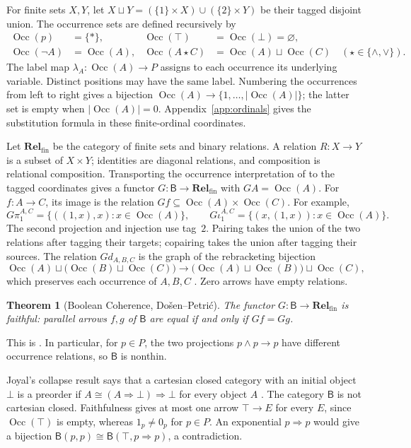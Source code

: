 \documentclass[11pt]{article}
\newtheorem{theorem}{Theorem}[section]
\newcommand{\B}{\mathsf B}
\newcommand{\Occ}{\operatorname{Occ}}
\newcommand{\Rel}{\mathbf{Rel}_{\mathrm{fin}}}
\begin{document}
For finite sets $X,Y$, let
$X\sqcup Y=(\{1\}\times X)\cup(\{2\}\times Y)$ be their tagged
disjoint union. The occurrence sets are defined recursively by
\[
 \begin{aligned}
 \Occ(p)&=\{*\},&
 \Occ(\top)&=\Occ(\bot)=\varnothing,\\
 \Occ(\neg A)&=\Occ(A),&
 \Occ(A\mathbin\star C)&=\Occ(A)\sqcup\Occ(C)
       \quad(\star\in\{\wedge,\vee\}).
 \end{aligned}
\]
The label map $\lambda_A:\Occ(A)\to P$ assigns to each occurrence
its underlying variable. Distinct positions may have the same label.
Numbering the occurrences from left to right gives a bijection
$\Occ(A)\to\{1,\ldots,|\Occ(A)|\}$; the latter set is empty when
$|\Occ(A)|=0$. Appendix~\ref{app:ordinals} gives the substitution
formula in these finite-ordinal coordinates.

Let $\Rel$ be the category of finite sets and binary relations.
A relation $R:X\to Y$ is a subset of $X\times Y$; identities are
diagonal relations, and composition is relational composition.
Transporting the occurrence interpretation of \cite{DP} to the
tagged coordinates gives a functor
$G:\B\to\Rel$ with $GA=\Occ(A)$. For $f:A\to C$, its image is
the relation $Gf\subseteq\Occ(A)\times\Occ(C)$.
For example,
\[
 G\pi_1^{A,C}=\{((1,x),x):x\in\Occ(A)\},\qquad
 G\iota_1^{A,C}=\{(x,(1,x)):x\in\Occ(A)\}.
\]
The second projection and injection use tag~$2$. Pairing takes the
union of the two relations after tagging their targets; copairing
takes the union after tagging their sources. The relation $Gd_{A,B,C}$
is the graph of the rebracketing bijection
\[
 \Occ(A)\sqcup\bigl(\Occ(B)\sqcup\Occ(C)\bigr)
 \longrightarrow
 \bigl(\Occ(A)\sqcup\Occ(B)\bigr)\sqcup\Occ(C),
\]
which preserves each occurrence of $A,B,C$
\cite[\S2.9, p.~60]{DP}. Zero arrows have empty relations.

\begin{theorem}[Boolean Coherence, Do\v{s}en--Petri\'c]
\label{thm:coherence}
The functor $G:\B\to\Rel$ is faithful: parallel arrows $f,g$ of
$\B$ are equal if and only if $Gf=Gg$.
\end{theorem}

This is \cite[\S14.2, p.~321]{DP}. In particular, for $p\in P$, the
two projections $p\wedge p\to p$ have different occurrence
relations, so $\B$ is nonthin.

Joyal's collapse result says that a cartesian closed category with
an initial object $\bot$ is a preorder if
$A\cong(A\Rightarrow\bot)\Rightarrow\bot$ for every object $A$
\cite[\S14.3, p.~324]{DP}.
The category $\B$ is not cartesian closed. Faithfulness gives at most
one arrow $\top\to E$ for every $E$, since $\Occ(\top)$ is empty,
whereas $1_p\ne0_p$ for $p\in P$. An exponential $p\Rightarrow p$
would give a bijection $\B(p,p)\cong\B(\top,p\Rightarrow p)$,
a contradiction.
\end{document}
